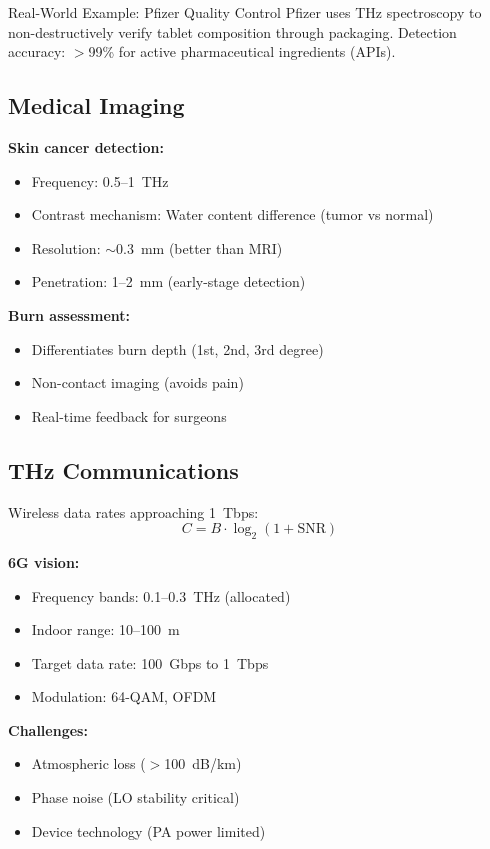 \begin{calloutbox}{Real-World Example: Pfizer Quality Control}
Pfizer uses THz spectroscopy to non-destructively verify tablet composition through packaging. Detection accuracy: $>$99\% for active pharmaceutical ingredients (APIs).
\end{calloutbox}

\subsection{Medical Imaging}

\textbf{Skin cancer detection:}
\begin{itemize}
\item Frequency: 0.5--1~THz
\item Contrast mechanism: Water content difference (tumor vs normal)
\item Resolution: $\sim$0.3~mm (better than MRI)
\item Penetration: 1--2~mm (early-stage detection)
\end{itemize}

\textbf{Burn assessment:}
\begin{itemize}
\item Differentiates burn depth (1st, 2nd, 3rd degree)
\item Non-contact imaging (avoids pain)
\item Real-time feedback for surgeons
\end{itemize}

\subsection{THz Communications}

Wireless data rates approaching 1~Tbps:
\begin{equation}
C = B \cdot \log_2(1 + \text{SNR})
\end{equation}

\textbf{6G vision:}
\begin{itemize}
\item Frequency bands: 0.1--0.3~THz (allocated)
\item Indoor range: 10--100~m
\item Target data rate: 100~Gbps to 1~Tbps
\item Modulation: 64-QAM, OFDM
\end{itemize}

\textbf{Challenges:}
\begin{itemize}
\item Atmospheric loss ($>$100~dB/km)
\item Phase noise (LO stability critical)
\item Device technology (PA power limited)
\end{itemize}

